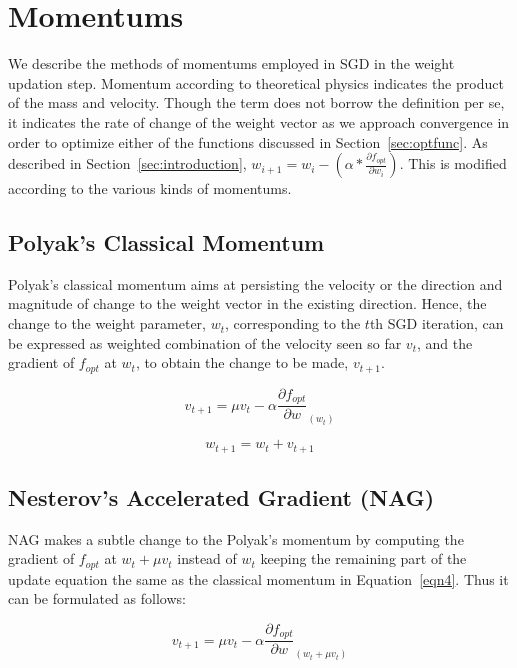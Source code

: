 \section{Momentums\label{sec:momentums}}
We describe the methods of momentums employed in SGD in the weight updation step. Momentum according to theoretical physics indicates the product of the mass and velocity. Though the term does not borrow the definition per se, it indicates the rate of change of the weight vector as we approach convergence in order to optimize either of the functions discussed in Section~\ref{sec:optfunc}. As described in Section~\ref{sec:introduction}, $ w_{i+1} = w_i - (\alpha * \frac{\partial f_{opt}}{\partial w_i})$. This is modified according to the various kinds of momentums.

\subsection{Polyak's Classical Momentum\label{sec:polyak}}
Polyak's classical momentum aims at persisting the velocity or the direction and magnitude of change to the weight vector in the existing direction. Hence, the change to the weight parameter, $w_t$, corresponding to the $t$th SGD iteration, can be expressed as weighted combination of the velocity seen so far $v_{t}$, and the gradient of $f_{opt}$ at $w_t$, to obtain the change to be made, $v_{t+1}$.

\begin{equation}
v_{t+1} = \mu v_t - \alpha\frac{\partial f_{opt}}{\partial w}_{(w_t)}
\label{eqn4}
\end{equation}

\begin{equation}
w_{t+1} = w_t + v_{t+1}
\end{equation}

\subsection{Nesterov's Accelerated Gradient (NAG)\label{sec:nag}}
NAG makes a subtle change to the Polyak's momentum by computing the gradient of $f_{opt}$ at $w_t+ \mu v_t$ instead of $w_t$ keeping the remaining part of the update equation the same as the classical momentum in Equation~\ref{eqn4}. Thus it can be formulated as follows:

\begin{equation}
v_{t+1} = \mu v_t - \alpha\frac{\partial f_{opt}}{\partial w}_{(w_t+\mu v_t)}
\label{eqn5}
\end{equation}